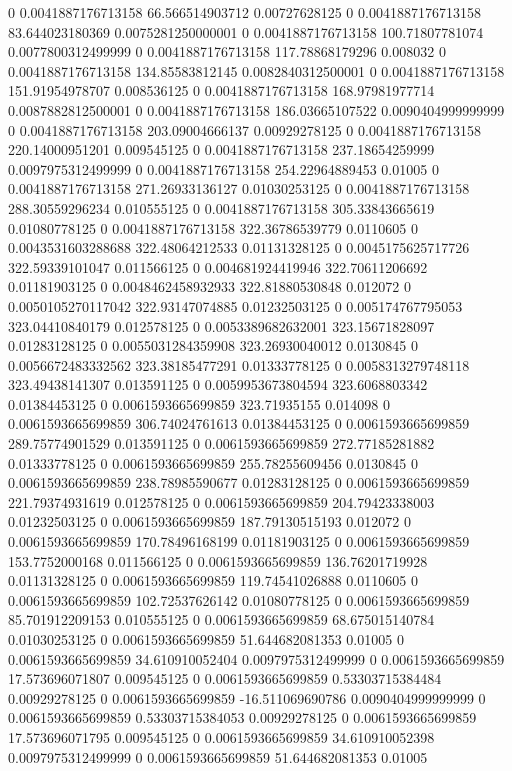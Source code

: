 0 0.0041887176713158 66.566514903712 0.00727628125
0 0.0041887176713158 83.644023180369 0.0075281250000001
0 0.0041887176713158 100.71807781074 0.0077800312499999
0 0.0041887176713158 117.78868179296 0.008032
0 0.0041887176713158 134.85583812145 0.0082840312500001
0 0.0041887176713158 151.91954978707 0.008536125
0 0.0041887176713158 168.97981977714 0.0087882812500001
0 0.0041887176713158 186.03665107522 0.0090404999999999
0 0.0041887176713158 203.09004666137 0.00929278125
0 0.0041887176713158 220.14000951201 0.009545125
0 0.0041887176713158 237.18654259999 0.0097975312499999
0 0.0041887176713158 254.22964889453 0.01005
0 0.0041887176713158 271.26933136127 0.01030253125
0 0.0041887176713158 288.30559296234 0.010555125
0 0.0041887176713158 305.33843665619 0.01080778125
0 0.0041887176713158 322.36786539779 0.0110605
0 0.0043531603288688 322.48064212533 0.01131328125
0 0.0045175625717726 322.59339101047 0.011566125
0 0.004681924419946 322.70611206692 0.01181903125
0 0.0048462458932933 322.81880530848 0.012072
0 0.0050105270117042 322.93147074885 0.01232503125
0 0.005174767795053 323.04410840179 0.012578125
0 0.0053389682632001 323.15671828097 0.01283128125
0 0.0055031284359908 323.26930040012 0.0130845
0 0.0056672483332562 323.38185477291 0.01333778125
0 0.0058313279748118 323.49438141307 0.013591125
0 0.0059953673804594 323.6068803342 0.01384453125
0 0.0061593665699859 323.71935155 0.014098
0 0.0061593665699859 306.74024761613 0.01384453125
0 0.0061593665699859 289.75774901529 0.013591125
0 0.0061593665699859 272.77185281882 0.01333778125
0 0.0061593665699859 255.78255609456 0.0130845
0 0.0061593665699859 238.78985590677 0.01283128125
0 0.0061593665699859 221.79374931619 0.012578125
0 0.0061593665699859 204.79423338003 0.01232503125
0 0.0061593665699859 187.79130515193 0.012072
0 0.0061593665699859 170.78496168199 0.01181903125
0 0.0061593665699859 153.7752000168 0.011566125
0 0.0061593665699859 136.76201719928 0.01131328125
0 0.0061593665699859 119.74541026888 0.0110605
0 0.0061593665699859 102.72537626142 0.01080778125
0 0.0061593665699859 85.701912209153 0.010555125
0 0.0061593665699859 68.675015140784 0.01030253125
0 0.0061593665699859 51.644682081353 0.01005
0 0.0061593665699859 34.610910052404 0.0097975312499999
0 0.0061593665699859 17.573696071807 0.009545125
0 0.0061593665699859 0.53303715384484 0.00929278125
0 0.0061593665699859 -16.511069690786 0.0090404999999999
0 0.0061593665699859 0.53303715384053 0.00929278125
0 0.0061593665699859 17.573696071795 0.009545125
0 0.0061593665699859 34.610910052398 0.0097975312499999
0 0.0061593665699859 51.644682081353 0.01005
